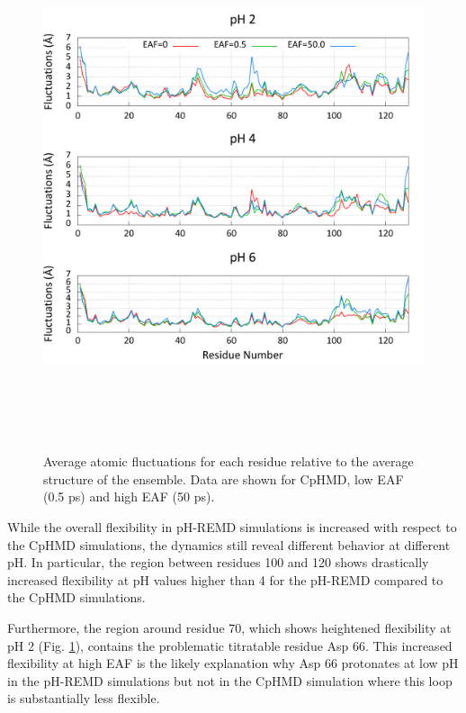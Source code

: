 \begin{figure}
 \includegraphics[width=6.5in, height=6.09in]{residue_fluctuations.png}
 \caption{Average atomic fluctuations for each residue relative to the average
          structure of the ensemble. Data are shown for CpHMD, low EAF (0.5
          ps) and high EAF (50 ps).}
 \label{fig3:fluxes}
\end{figure}

While the overall flexibility in pH-REMD simulations is increased with respect
to the CpHMD simulations, the dynamics still reveal different behavior at
different pH.  In particular, the region between residues 100 and 120 shows
drastically increased flexibility at pH values higher than 4 for the pH-REMD
compared to the CpHMD simulations.

Furthermore, the region around residue 70, which shows heightened flexibility at
pH 2 (Fig. \ref{fig3:fluxes}), contains the problematic titratable residue Asp
66.  This increased flexibility at high EAF is the likely explanation why Asp 66
protonates at low pH in the pH-REMD simulations but not in the CpHMD simulation
where this loop is substantially less flexible.

